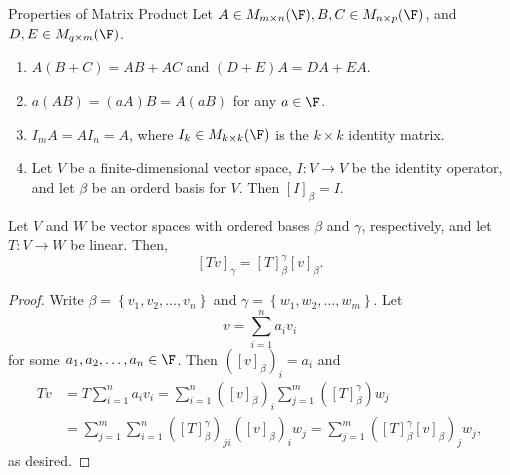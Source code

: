 \documentclass[linearalgebraI]{subfiles}
\begin{document}
    \begin{prop}{Properties of Matrix Product}
        Let $A\in M_{m\times n}(\F), B,C\in M_{n\times p}(\F)$, and $D,E\in M_{q\times m}(\F)$.
        \begin{enumerate}
            \item $A\left( B+C \right) = AB+AC$ and $\left( D+E \right) A = DA+EA$.
            \item $a\left( AB \right) = \left( aA \right) B = A\left( aB \right)$ for any $a\in\F$.
            \item $I_mA = AI_n = A$, where $I_k\in M_{k\times k}(\F)$ is the $k\times k$ identity matrix. 
            \item Let $V$ be a finite-dimensional vector space, $I:V\to V$ be the identity operator, and let $\beta$ be an orderd basis for $V$. Then $\left[ I \right] _\beta = I$.
        \end{enumerate}
    \end{prop}

    \begin{prop}{}
        Let $V$ and $W$ be vector spaces with ordered bases $\beta$ and $\gamma$, respectively, and let $T:V\to W$ be linear. Then,
        \begin{equation*}
            \left[ Tv \right] _\gamma = \left[ T \right] ^\gamma_\beta \left[ v \right] _\beta.
        \end{equation*}
    \end{prop}

    \begin{proof}
        Write $\beta=\left\lbrace v_1,v_2,\ldots,v_n \right\rbrace$ and $\gamma=\left\lbrace w_1,w_2,\ldots,w_m \right\rbrace$. Let
        \begin{equation*}
            v = \sum^{n}_{i=1} a_iv_i
        \end{equation*}
        for some $a_1,a_2,\ldots,a_n\in\F$. Then $\left( \left[ v \right] _\beta \right) _i = a_i$ and 
        \begin{align*}
            Tv & = T\sum^{n}_{i=1} a_iv_i = \sum^{n}_{i=1} \left( \left[ v \right] _\beta \right) _i\sum^{m}_{j=1} \left( \left[ T \right] ^\gamma_\beta \right) w_j \\
               & = \sum^{m}_{j=1} \sum^{n}_{i=1} \left( \left[ T \right] ^\gamma_\beta \right) _{ji}\left( \left[ v \right] _\beta \right) _i w_j = \sum^{m}_{j=1} \left( \left[ T \right] ^\gamma_\beta \left[ v \right] _\beta \right) _jw_j,
        \end{align*} 
        as desired.
    \end{proof}
\end{document}
